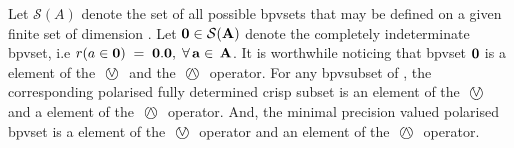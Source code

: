 \documentclass[a4paper,12pt,english]{sphinxhowto}
\begin{document}
\sphinxAtStartPar
Let \(\mathcal{S}(A)\) denote the set of all possible bpv\sphinxhyphen{}sets that may be defined on a given finite set  of dimension . Let \(\bf{0} \in \mathcal{S}(A)\)  denote the completely indeterminate bpv\sphinxhyphen{}set, i.e \(r(a \in \bf{0}) \;=\; 0.0 , \; \forall \,a \in\, A\). It is worthwhile noticing that bpv\sphinxhyphen{}set \(\bf{0}\) is a  element of the \($ \textcircled{$\vee$} $\) and the \($ \textcircled{$\wedge$} $\) operator. For any bpv\sphinxhyphen{}subset of , the corresponding polarised \textendash{}fully determined\textendash{} crisp subset is an  element of the \($ \textcircled{$\vee$} $\) and a  element of the \($ \textcircled{$\wedge$} $\) operator. And, the minimal precision valued polarised bpv\sphinxhyphen{}set is a  element of the \($ \textcircled{$\vee$} $\) operator and an  element of the \($ \textcircled{$\wedge$} $\) operator.
\def\sphinxLiteralBlockLabel{\label{\detokenize{pearls:bipolarvaluedsets5}}}
%
\end{document}

